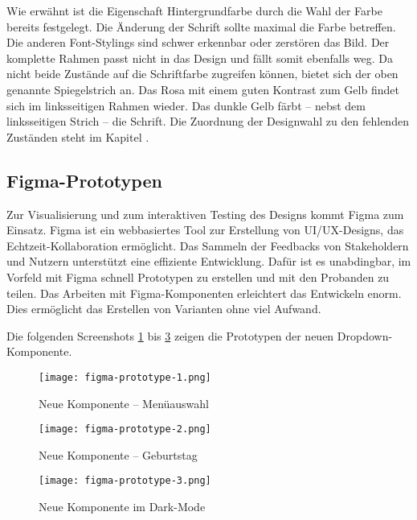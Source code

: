 Wie erwähnt ist die Eigenschaft Hintergrundfarbe durch die Wahl der Farbe bereits festgelegt. 
Die Änderung der Schrift sollte maximal die Farbe betreffen. 
Die anderen Font-Stylings sind schwer erkennbar oder zerstören das Bild. 
Der komplette Rahmen passt nicht in das Design und fällt somit ebenfalls weg. 
Da nicht beide Zustände auf die Schriftfarbe zugreifen können, bietet sich der oben genannte Spiegelstrich an. 
Das Rosa mit einem guten Kontrast zum Gelb findet sich im linksseitigen Rahmen wieder. 
Das dunkle Gelb färbt – nebst dem linksseitigen Strich – die Schrift. 
Die Zuordnung der Designwahl zu den fehlenden Zuständen steht im Kapitel \textbf{}. 


\clearpage
\subsection{Figma-Prototypen}
\label{sec:figmaPrototype}

Zur Visualisierung und zum interaktiven Testing des Designs kommt Figma zum Einsatz. 
Figma ist ein webbasiertes Tool zur Erstellung von UI/UX-Designs, das Echtzeit-Kollaboration ermöglicht. 
Das Sammeln der Feedbacks von Stakeholdern und Nutzern unterstützt eine effiziente Entwicklung. 
Dafür ist es unabdingbar, im Vorfeld mit Figma schnell Prototypen zu erstellen und mit den Probanden zu teilen. 
Das Arbeiten mit Figma-Komponenten erleichtert das Entwickeln enorm. 
Dies ermöglicht das Erstellen von Varianten ohne viel Aufwand. 

Die folgenden Screenshots \ref{img:figmaPrototype1} bis \ref{img:figmaPrototype3} zeigen die Prototypen der neuen Drop\-down-Kom\-po\-nente. 

\begin{figure}[!htb]
    \centering
    \texttt{[image: figma-prototype-1.png]}
    \caption{\centering Neue Komponente – Menüauswahl}
    \label{img:figmaPrototype1}
\end{figure}

\begin{figure}[!htb]
    \centering
    \texttt{[image: figma-prototype-2.png]}
    \caption{\centering Neue Komponente – Geburtstag}
    \label{img:figmaPrototype2}
\end{figure}

\begin{figure}[!htb]
    \centering
    \texttt{[image: figma-prototype-3.png]}
    \caption{\centering Neue Komponente im Dark-Mode}
    \label{img:figmaPrototype3}
\end{figure}

